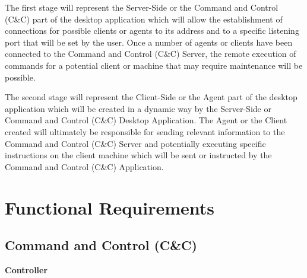 \newpage

The first stage will represent the Server-Side or the Command and Control (C\&C) part of the desktop application
which will allow the establishment of connections for possible clients or agents to its address and to
a specific listening port that will be set by the user. Once a number of agents or clients have been
connected to the Command and Control (C\&C) Server, the remote execution of commands for a potential
client or machine that may require maintenance will be possible.

The second stage will represent the Client-Side or the Agent part of the desktop application which
will be created in a dynamic way by the Server-Side or Command and Control (C\&C) Desktop Application.
The Agent or the Client created will ultimately be responsible for sending relevant information to
the Command and Control (C\&C) Server and potentially executing specific instructions on the client
machine which will be sent or instructed by the Command and Control (C\&C) Application.

\section{Functional Requirements}

\subsection{Command and Control (C\&C)}

\noindent
\textbf{Controller}

